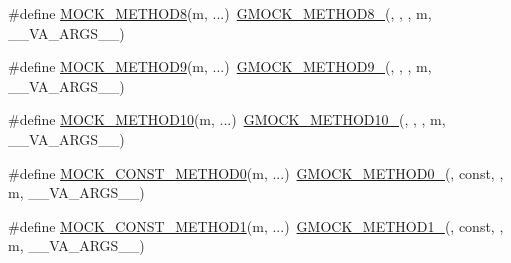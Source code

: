 \begin{DoxyCompactItemize}
\item 
\#define \mbox{\hyperlink{googletest-master_2googlemock_2include_2gmock_2gmock-generated-function-mockers_8h_ae77220bef9ab254c331b9026a3d18dba}{M\+O\+C\+K\+\_\+\+M\+E\+T\+H\+O\+D8}}(m, ...)~\mbox{\hyperlink{_obj__test_2lib_2googletest-release-1_88_81_2googlemock_2include_2gmock_2gmock-generated-function-mockers_8h_aa84a36427c44505207b7cad5dec7ad67}{G\+M\+O\+C\+K\+\_\+\+M\+E\+T\+H\+O\+D8\+\_\+}}(, , , m, \+\_\+\+\_\+\+V\+A\+\_\+\+A\+R\+G\+S\+\_\+\+\_\+)
\item 
\#define \mbox{\hyperlink{googletest-master_2googlemock_2include_2gmock_2gmock-generated-function-mockers_8h_ad6b30841fe780994d216cc8829cc127f}{M\+O\+C\+K\+\_\+\+M\+E\+T\+H\+O\+D9}}(m, ...)~\mbox{\hyperlink{_obj__test_2lib_2googletest-release-1_88_81_2googlemock_2include_2gmock_2gmock-generated-function-mockers_8h_aa820171a19cc587c247dbe05cbffc55f}{G\+M\+O\+C\+K\+\_\+\+M\+E\+T\+H\+O\+D9\+\_\+}}(, , , m, \+\_\+\+\_\+\+V\+A\+\_\+\+A\+R\+G\+S\+\_\+\+\_\+)
\item 
\#define \mbox{\hyperlink{googletest-master_2googlemock_2include_2gmock_2gmock-generated-function-mockers_8h_a01760fdd295f5a92264eed6a9ff1dbf8}{M\+O\+C\+K\+\_\+\+M\+E\+T\+H\+O\+D10}}(m, ...)~\mbox{\hyperlink{_obj__test_2lib_2googletest-release-1_88_81_2googlemock_2include_2gmock_2gmock-generated-function-mockers_8h_a81a48223a8771de36ef92ac6d56f6e81}{G\+M\+O\+C\+K\+\_\+\+M\+E\+T\+H\+O\+D10\+\_\+}}(, , , m, \+\_\+\+\_\+\+V\+A\+\_\+\+A\+R\+G\+S\+\_\+\+\_\+)
\item 
\#define \mbox{\hyperlink{googletest-master_2googlemock_2include_2gmock_2gmock-generated-function-mockers_8h_ac86e04e649fa8bf35b5f0149a13c935d}{M\+O\+C\+K\+\_\+\+C\+O\+N\+S\+T\+\_\+\+M\+E\+T\+H\+O\+D0}}(m, ...)~\mbox{\hyperlink{_obj__test_2lib_2googletest-release-1_88_81_2googlemock_2include_2gmock_2gmock-generated-function-mockers_8h_ae0d290ffa58d7c624b2e3487ba1252f4}{G\+M\+O\+C\+K\+\_\+\+M\+E\+T\+H\+O\+D0\+\_\+}}(, const, , m, \+\_\+\+\_\+\+V\+A\+\_\+\+A\+R\+G\+S\+\_\+\+\_\+)
\item 
\#define \mbox{\hyperlink{googletest-master_2googlemock_2include_2gmock_2gmock-generated-function-mockers_8h_a6f76aeb56f492cfe538e177b6aa77965}{M\+O\+C\+K\+\_\+\+C\+O\+N\+S\+T\+\_\+\+M\+E\+T\+H\+O\+D1}}(m, ...)~\mbox{\hyperlink{_obj__test_2lib_2googletest-release-1_88_81_2googlemock_2include_2gmock_2gmock-generated-function-mockers_8h_a1bc0012d62440dda77208dabdf4925c9}{G\+M\+O\+C\+K\+\_\+\+M\+E\+T\+H\+O\+D1\+\_\+}}(, const, , m, \+\_\+\+\_\+\+V\+A\+\_\+\+A\+R\+G\+S\+\_\+\+\_\+)
\item 

\end{DoxyCompactItemize}
